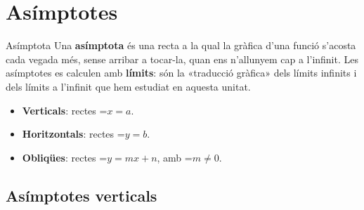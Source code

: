 \documentclass[11pt,a4paper]{article}
\newcommand{\fmm}[1]{\setbox0=\hbox{$#1$}\ifdim\wd0>\linewidth\fmdisp{#1}\else\mbox{\box0}\fi}
\newcommand{\fmdisp}[1]{\[\setbox2=\hbox{$\displaystyle #1$}\ifdim\wd2>\linewidth\resizebox{\linewidth}{!}{\box2}\else\box2\fi\]}
\begin{document}
\section{Asímptotes}\hypertarget{sec13}{}

\begin{fmdef}{Asímptota}
Una \textbf{asímptota} és una recta a la qual la gràfica d'una funció s'acosta cada vegada més, sense arribar a tocar-la, quan ens n'allunyem cap a l'infinit. Les asímptotes es calculen amb \textbf{límits}: són la «traducció gràfica» dels límits infinits i dels límits a l'infinit que hem estudiat en aquesta unitat.

\begin{itemize}
\item \textbf{Verticals}: rectes \fmm{x=a}.
\item \textbf{Horitzontals}: rectes \fmm{y=b}.
\item \textbf{Obliqües}: rectes \fmm{y=mx+n}, amb \fmm{m\neq0}.
\end{itemize}
\end{fmdef}

\subsection*{Asímptotes verticals}
\end{document}
